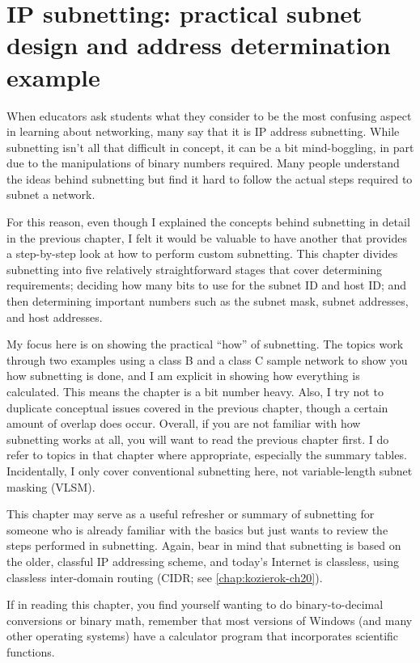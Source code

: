 \chapter[IP subnetting: examples]{IP subnetting: practical subnet design and address determination example}
\label{chap:kozierok-ch19}

When educators ask students what they consider to be the most confusing aspect in learning about networking, many say that it is IP address subnetting.
While subnetting isn't all that difficult in concept, it can be a bit mind-boggling, in part due to the manipulations of binary numbers required.
Many people understand the ideas behind subnetting but find it hard to follow the actual steps required to subnet a network.

For this reason, even though I explained the concepts behind subnetting in detail in the previous chapter, I felt it would be valuable to have another that provides a step-by-step look at how to perform custom subnetting.
This chapter divides subnetting into five relatively straightforward stages that cover determining requirements; deciding how many bits to use for the subnet ID and host ID; and then determining important numbers such as the subnet mask, subnet addresses, and host addresses.

My focus here is on showing the practical ``how'' of subnetting.
The topics work through two examples using a class B and a class C sample network to show you how subnetting is done, and I am explicit in showing how everything is calculated.
This means the chapter is a bit number heavy.
Also, I try not to duplicate conceptual issues covered in the previous chapter, though a certain amount of overlap does occur.
Overall, if you are not familiar with how subnetting works at all, you will want to read the previous chapter first.
I do refer to topics in that chapter where appropriate, especially the summary tables.
Incidentally, I only cover conventional subnetting here, not variable-length subnet masking (VLSM).

This chapter may serve as a useful refresher or summary of subnetting for someone who is already familiar with the basics but just wants to review the
steps performed in subnetting.
Again, bear in mind that subnetting is based on the older, classful IP addressing scheme, and today's Internet is classless, using classless inter-domain routing (CIDR; see \vref{chap:kozierok-ch20}).

\begin{note}
If in reading this chapter, you find yourself wanting to do binary-to-decimal conversions or binary math, remember that most
versions of Windows (and many other operating systems) have a calculator program that incorporates scientific functions.
\end{note}

